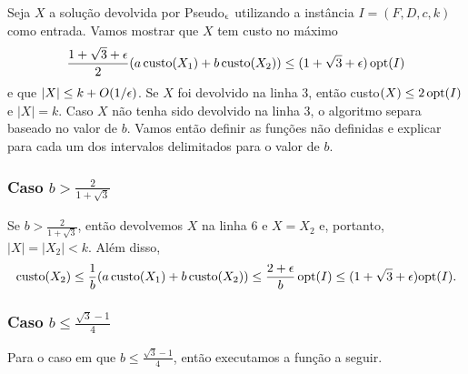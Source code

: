 Seja $X$ a solução devolvida por {\sc Pseudo}$_\epsilon$ utilizando a instância ${I = (F,D,c,k)}$ como entrada. Vamos mostrar que $X$ tem custo no máximo 
\begin{equation}
    {\frac{1 + \sqrt{3} + \epsilon}{2} (a \, \text{custo}(X_1) + b \, \text{custo}(X_2)) \leq (1 + \sqrt{3} + \epsilon) \, \ensuremath{\mathrm{opt}}(I)} \nonumber
\end{equation}
e que $|X| \leq k + O(1/\epsilon)$.
Se $X$ foi devolvido na linha 3, então custo$(X) \leq 2 \, \mathrm{opt}(I)$ e $|X| = k$. Caso $X$ não tenha sido devolvido na linha 3, o algoritmo separa baseado no valor de $b$. Vamos então definir as funções não definidas e explicar para cada um dos intervalos delimitados para o valor de $b$.

\subsubsection{Caso $b > \frac{2}{1+\sqrt{3}}$}

Se $b > \frac{2}{1+\sqrt{3}}$, então devolvemos $X$ na linha 6 e $X = X_2$ e, portanto, $|X| = |X_2| < k$. Além disso,
\begin{align}
    \text{custo}(X_2) \leq \frac{1}{b} ( a \, \text{custo}(X_1) + b \, \text{custo}(X_2)) \leq \frac{2 + \epsilon}{b}\, \mathrm{opt}(I) \leq (1 + \sqrt{3} + \epsilon) \mathrm{opt}(I). \nonumber
\end{align}

\subsubsection{Caso $b \leq \frac{\sqrt{3} - 1}{4} $}

Para o caso em que $b \leq \frac{\sqrt{3} - 1}{4}$, então executamos a função a seguir.

